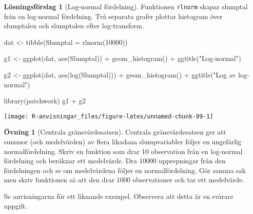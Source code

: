 \documentclass[
]{book}
\newenvironment{Shaded}{\begin{snugshade}}{\end{snugshade}}
\newcommand{\AttributeTok}[1]{\textcolor[rgb]{0.77,0.63,0.00}{#1}}
\newcommand{\DecValTok}[1]{\textcolor[rgb]{0.00,0.00,0.81}{#1}}
\newcommand{\FunctionTok}[1]{\textcolor[rgb]{0.00,0.00,0.00}{#1}}
\newcommand{\NormalTok}[1]{#1}
\newcommand{\OtherTok}[1]{\textcolor[rgb]{0.56,0.35,0.01}{#1}}
\newcommand{\SpecialCharTok}[1]{\textcolor[rgb]{0.00,0.00,0.00}{#1}}
\newcommand{\StringTok}[1]{\textcolor[rgb]{0.31,0.60,0.02}{#1}}
\theoremstyle{definition}
\theoremstyle{definition}
\theoremstyle{definition}
\newtheorem{exercise}{Övning}[chapter]
\theoremstyle{definition}
\newtheorem{hypothesis}{Lösningsförslag}[chapter]
\theoremstyle{remark}
\begin{document}
\begin{hypothesis}[Log-normal fördelning]

Funktionen \texttt{rlnorm} skapar slumptal från en log-normal fördelning. Två separata grafer plottar histogram över slumptalen och slumptalen efter log-transform.

\begin{Shaded}
\begin{Highlighting}[]
\NormalTok{dat }\OtherTok{\textless{}{-}} \FunctionTok{tibble}\NormalTok{(}\AttributeTok{Slumptal =} \FunctionTok{rlnorm}\NormalTok{(}\DecValTok{10000}\NormalTok{))}

\NormalTok{g1 }\OtherTok{\textless{}{-}} \FunctionTok{ggplot}\NormalTok{(dat, }\FunctionTok{aes}\NormalTok{(Slumptal)) }\SpecialCharTok{+} 
  \FunctionTok{geom\_histogram}\NormalTok{() }\SpecialCharTok{+}
  \FunctionTok{ggtitle}\NormalTok{(}\StringTok{"Log{-}normal"}\NormalTok{)}
  
\NormalTok{g2 }\OtherTok{\textless{}{-}} \FunctionTok{ggplot}\NormalTok{(dat, }\FunctionTok{aes}\NormalTok{(}\FunctionTok{log}\NormalTok{(Slumptal))) }\SpecialCharTok{+} 
  \FunctionTok{geom\_histogram}\NormalTok{() }\SpecialCharTok{+}
  \FunctionTok{ggtitle}\NormalTok{(}\StringTok{"Log av log{-}normal"}\NormalTok{)}

\FunctionTok{library}\NormalTok{(patchwork)}
\NormalTok{g1 }\SpecialCharTok{+}\NormalTok{ g2}
\end{Highlighting}
\end{Shaded}

\begin{center}\texttt{[image: R-anvisningar\_files/figure-latex/unnamed-chunk-99-1]} \end{center}

\end{hypothesis}

\begin{exercise}[Centrala gränsvärdesatsen]
Centrala gränsvärdesatsen ger att summor (och medelvärden) av flera likadana slumpvariabler följer en ungefärlig normalfördelning. Skriv en funktion som drar 10 observation från en log-normal fördelning och beräknar ett medelvärde. Dra 10000 upprepningar från den fördelningen och se om medelvärdena följer en normalfördelning. Gör samma sak men skriv funktionen så att den drar 1000 observationer och tar ett medelvärde.

Se anvisningarna för ett liknande exempel. Observera att detta är en svårare uppgift.
\end{exercise}
\end{document}

